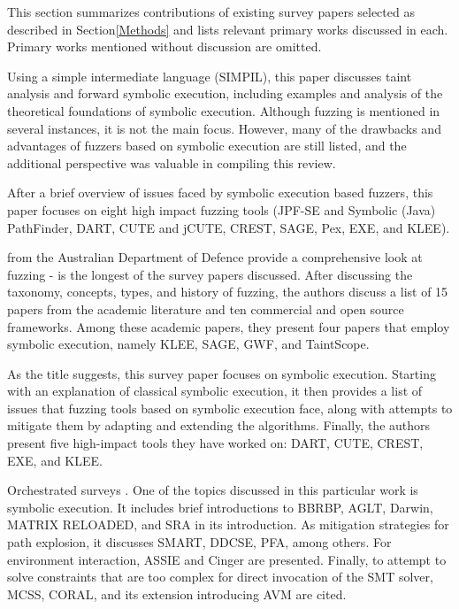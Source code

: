 \documentclass{article}
\begin{document}
\begin{multicols}{2}
    This section summarizes contributions of existing survey papers selected as described in Section\ref{Methods} and lists relevant primary works discussed in each. Primary works mentioned without discussion are omitted.

    Using a simple intermediate language (SIMPIL), this paper discusses taint analysis and forward symbolic execution, including examples and analysis of the theoretical foundations of symbolic execution. Although fuzzing is mentioned in several instances, it is not the main focus. However, many of the drawbacks and advantages of fuzzers based on symbolic execution are still listed, and the additional perspective was valuable in compiling this review.

    After a brief overview of issues faced by symbolic execution based fuzzers, this paper focuses on eight high impact fuzzing tools (JPF-SE and Symbolic (Java) PathFinder\cite{JPFSE, JavaPathFinder}, DART\cite{DART}, CUTE\cite{CUTE} and jCUTE\cite{ExplicitPathModelChecking}, CREST\cite{CREST}, SAGE\cite{SAGE}, Pex\cite{Pex}, EXE\cite{EXE}, and KLEE\cite{KLEE}).

    \citeauthor{FuzzingTheStateOfTheArt} from the Australian Department of Defence provide a comprehensive look at fuzzing -  is the longest of the survey papers discussed. After discussing the taxonomy, concepts, types, and history of fuzzing, the authors discuss a list of 15 papers from the academic literature and ten commercial and open source frameworks. Among these academic papers, they present four papers that employ symbolic execution, namely KLEE\cite{KLEE}, SAGE\cite{SAGE}, GWF\cite{GWF}, and TaintScope\cite{TaintScope}.

    As the title suggests, this survey paper focuses on symbolic execution. Starting with an explanation of classical symbolic execution, it then provides a list of issues that fuzzing tools based on symbolic execution face, along with attempts to mitigate them by adapting and extending the algorithms. Finally, the authors present five high-impact tools they have worked on: DART\cite{DART}, CUTE\cite{CUTE}, CREST\cite{CREST}, EXE\cite{EXE}, and KLEE\cite{KLEE}.

    Orchestrated surveys \cite{Orchestrated}. One of the topics discussed in this particular work is symbolic execution. It includes brief introductions to BBRBP\cite{BBRBP}, AGLT\cite{AGLT}, Darwin\cite{Darwin}, MATRIX RELOADED\cite{MATRIXRELOADED}, and SRA\cite{SRA} in its introduction. As mitigation strategies for path explosion, it discusses SMART\cite{SMART}, DDCSE\cite{DDCSE}, PFA\cite{PFA}, among others. For environment interaction, ASSIE\cite{ASSIE} and Cinger\cite{Cinger} are presented. Finally, to attempt to solve constraints that are too complex for direct invocation of the SMT solver, MCSS\cite{MCSS}, CORAL\cite{CORAL}, and its extension introducing AVM\cite{CORALAVM} are cited.


\end{multicols}
\end{document}
